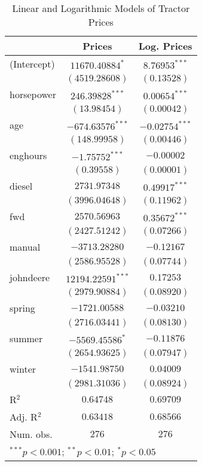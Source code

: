 
\begin{table}
\begin{center}
\begin{tabular}{l c c}
\hline
 & Prices & Log. Prices \\
\hline
(Intercept) & $11670.40884^{*}$   & $8.76953^{***}$  \\
            & $(4519.28608)$      & $(0.13528)$      \\
horsepower  & $246.39828^{***}$   & $0.00654^{***}$  \\
            & $(13.98454)$        & $(0.00042)$      \\
age         & $-674.63576^{***}$  & $-0.02754^{***}$ \\
            & $(148.99958)$       & $(0.00446)$      \\
enghours    & $-1.75752^{***}$    & $-0.00002$       \\
            & $(0.39558)$         & $(0.00001)$      \\
diesel      & $2731.97348$        & $0.49917^{***}$  \\
            & $(3996.04648)$      & $(0.11962)$      \\
fwd         & $2570.56963$        & $0.35672^{***}$  \\
            & $(2427.51242)$      & $(0.07266)$      \\
manual      & $-3713.28280$       & $-0.12167$       \\
            & $(2586.95528)$      & $(0.07744)$      \\
johndeere   & $12194.22591^{***}$ & $0.17253$        \\
            & $(2979.90884)$      & $(0.08920)$      \\
spring      & $-1721.00588$       & $-0.03210$       \\
            & $(2716.03441)$      & $(0.08130)$      \\
summer      & $-5569.45586^{*}$   & $-0.11876$       \\
            & $(2654.93625)$      & $(0.07947)$      \\
winter      & $-1541.98750$       & $0.04009$        \\
            & $(2981.31036)$      & $(0.08924)$      \\
\hline
R$^2$       & $0.64748$           & $0.69709$        \\
Adj. R$^2$  & $0.63418$           & $0.68566$        \\
Num. obs.   & $276$               & $276$            \\
\hline
\multicolumn{3}{l}{\scriptsize{$^{***}p<0.001$; $^{**}p<0.01$; $^{*}p<0.05$}}
\end{tabular}
\caption{Linear and Logarithmic Models of Tractor Prices}
\label{tab:reg_price_w_log}
\end{center}
\end{table}
